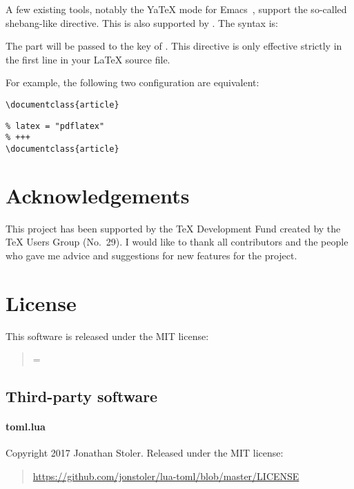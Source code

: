 \documentclass{llmk-doc}
\begin{document}
A few existing tools, notably the YaTeX mode for Emacs~\cite{yatex}, support
the so-called shebang-like directive. This is also supported by .
The syntax is:
%
\begin{htcode}
\end{htcode}
%
The  part will be passed to the  key of .
This directive is only effective strictly in the first line in your {\LaTeX}
source file.

For example, the following two configuration are equivalent:\\
%
\begin{minipage}[t]{.5\textwidth}
\begin{lstlisting}[style=latex]
%#!pdflatex
\documentclass{article}
\end{lstlisting}
\end{minipage}
\begin{minipage}[t]{.49\textwidth}
\begin{lstlisting}[style=latex]
% +++
% latex = "pdflatex"
% +++
\documentclass{article}
\end{lstlisting}
\end{minipage}

\section{Acknowledgements}

This project has been supported by the {\TeX} Development Fund created by the {\TeX}
Users Group (No.~29). I would like to thank all contributors and the people who
gave me advice and suggestions for new features for the  project.

\section{License}

This software is released under the MIT license:
%
\begin{quotation}
\parindent=0pt
\parskip=\baselineskip
\small\ttfamily
\noindent
\printLICENSE
\end{quotation}

\subsection*{Third-party software}

\paragraph{toml.lua} Copyright 2017 Jonathan Stoler. Released under the MIT
license:
%
\begin{quote}
\url{https://github.com/jonstoler/lua-toml/blob/master/LICENSE}
\end{quote}
\end{document}
